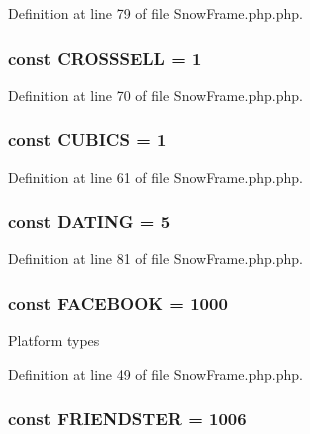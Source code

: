 Definition at line 79 of file SnowFrame.php.php.

\hypertarget{classSnowFrame_a775a9786534a937a818bc5f089d4682b}{
\subsubsection[{CROSSSELL}]{\setlength{\rightskip}{0pt plus 5cm}const {\bf CROSSSELL} = 1}}
\label{classSnowFrame_a775a9786534a937a818bc5f089d4682b}


Definition at line 70 of file SnowFrame.php.php.

\hypertarget{classSnowFrame_a8b1943afc6a89b00245090e33dbcd2d4}{
\subsubsection[{CUBICS}]{\setlength{\rightskip}{0pt plus 5cm}const {\bf CUBICS} = 1}}
\label{classSnowFrame_a8b1943afc6a89b00245090e33dbcd2d4}


Definition at line 61 of file SnowFrame.php.php.

\hypertarget{classSnowFrame_a758179882b25299240e0d4e2594e5738}{
\subsubsection[{DATING}]{\setlength{\rightskip}{0pt plus 5cm}const {\bf DATING} = 5}}
\label{classSnowFrame_a758179882b25299240e0d4e2594e5738}


Definition at line 81 of file SnowFrame.php.php.

\hypertarget{classSnowFrame_a4d941b34615abdaa9658f44d6db72f02}{
\subsubsection[{FACEBOOK}]{\setlength{\rightskip}{0pt plus 5cm}const {\bf FACEBOOK} = 1000}}
\label{classSnowFrame_a4d941b34615abdaa9658f44d6db72f02}
Platform types 

Definition at line 49 of file SnowFrame.php.php.

\hypertarget{classSnowFrame_a90f6b4c4363ec09c24dddfaacaab6271}{
\subsubsection[{FRIENDSTER}]{\setlength{\rightskip}{0pt plus 5cm}const {\bf FRIENDSTER} = 1006}}
\label{classSnowFrame_a90f6b4c4363ec09c24dddfaacaab6271}


